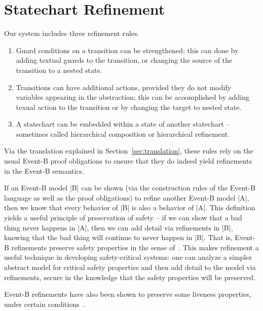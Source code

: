 
\section{Statechart Refinement}
\label{sec:scref}

Our system includes three refinement rules.

\begin{enumerate}
\item Guard conditions on a transition can be strengthened; 
this can done by adding textual guards to the transition, or
changing the source of the transition to a nested state.
\item Transitions can have additional actions, provided they do not
  modify variables appearing in the abstraction; this can be 
  acoomplished by adding texual action to the transition 
  or by changing the target to nested state.
\item A statechart can be embedded within a state of another
  statechart -- sometimes called hierarchical composition or
  hierarchical refinement.
\end{enumerate}

Via the translation explained in Section~\ref{sec:translation}, these rules
rely on the usual Event-B proof obligations to ensure that they do
indeed yield refinements in the Event-B semantics.

If an Event-B model |B| can be shown (via the construction rules of
the Event-B language as well as the proof obligations) to refine
another Event-B model |A|, then we know that every behavior of |B| is
also a behavior of |A|. This definition yields a useful principle of
preservation of safety -- if we can show that a bad thing never
happens in |A|, then we can add detail via refinements in |B|, knowing
that the bad thing will continue to never happen in |B|. That is,
Event-B refinements preserve safety properties in the sense
of~\cite{lamport1977proving}. This makes refinement a useful technique
in developing safety-critical systems: one can analyze a simpler
abstract model for critical safety properties and then add detail to
the model via refinements, secure in the knowledge that the safety
properties will be preserved.

Event-B refinements have also been shown to preserve some liveness
properties, under certain conditions~\cite{hoang2016ltl}.

